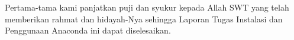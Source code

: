 \begin{acknowledgements}
Pertama-tama kami panjatkan puji dan syukur kepada Allah SWT yang telah memberikan rahmat dan hidayah-Nya sehingga Laporan Tugas Instalasi dan Penggunaan Anaconda ini dapat diselesaikan.
\end{acknowledgements}